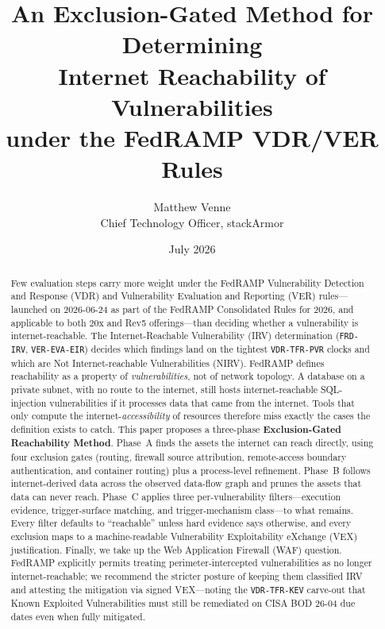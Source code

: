 \documentclass[11pt]{article}
\title{\bfseries An Exclusion-Gated Method for Determining\\ Internet Reachability of Vulnerabilities\\ under the FedRAMP VDR/VER Rules}
\author{Matthew Venne \\ \small Chief Technology Officer, stackArmor}
\date{July 2026}
\newcommand{\code}[1]{\texttt{#1}}
\begin{document}
\maketitle

\begin{abstract}
\noindent
Few evaluation steps carry more weight under the FedRAMP Vulnerability Detection and Response (VDR) and Vulnerability Evaluation and Reporting (VER) rules---launched on 2026-06-24 as part of the FedRAMP Consolidated Rules for 2026, and applicable to both 20x and Rev5 offerings---than deciding whether a vulnerability is internet-reachable. The Internet-Reachable Vulnerability (IRV) determination (\code{FRD-IRV}, \code{VER-EVA-EIR}) decides which findings land on the tightest \code{VDR-TFR-PVR} clocks and which are Not Internet-reachable Vulnerabilities (NIRV). FedRAMP defines reachability as a property of \emph{vulnerabilities}, not of network topology. A database on a private subnet, with no route to the internet, still hosts internet-reachable SQL-injection vulnerabilities if it processes data that came from the internet. Tools that only compute the internet-\emph{accessibility} of resources therefore miss exactly the cases the definition exists to catch. This paper proposes a three-phase \textbf{Exclusion-Gated Reachability Method}. Phase~A finds the assets the internet can reach directly, using four exclusion gates (routing, firewall source attribution, remote-access boundary authentication, and container routing) plus a process-level refinement. Phase~B follows internet-derived data across the observed data-flow graph and prunes the assets that data can never reach. Phase~C applies three per-vulnerability filters---execution evidence, trigger-surface matching, and trigger-mechanism class---to what remains. Every filter defaults to ``reachable'' unless hard evidence says otherwise, and every exclusion maps to a machine-readable Vulnerability Exploitability eXchange (VEX) justification. Finally, we take up the Web Application Firewall (WAF) question. FedRAMP explicitly permits treating perimeter-intercepted vulnerabilities as no longer internet-reachable; we recommend the stricter posture of keeping them classified IRV and attesting the mitigation via signed VEX---noting the \code{VDR-TFR-KEV} carve-out that Known Exploited Vulnerabilities must still be remediated on CISA BOD 26-04 due dates even when fully mitigated.
\end{abstract}
\end{document}
